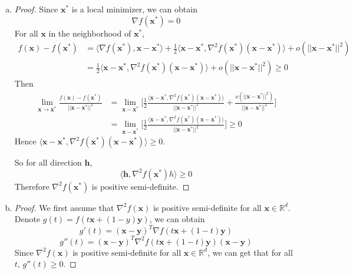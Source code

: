 \documentclass[12pt]{article}
\newcommand{\R}{\mathbb{R}}
\renewcommand{\vec}[1]{\mathbf{#1}}
\begin{document}
\begin{enumerate}[1)]
\begin{enumerate}[(a)]
\begin{proof}
            Therefore, if $f$ is strictly convex, then $f$ has at most one global minimizer.
        \end{proof}
        \item
        \begin{proof}
        	Since $\vec{x}^{*}$ is a local minimizer,  we can obtain
            $$\nabla f(\vec{x}^{*}) = 0$$
            For all $\vec{x}$ in the neighborhood of $\vec{x}^{*}$,
            \begin{align*}
            	f(\vec{x}) - f(\vec{x}^{*}) & = \langle \nabla f(\vec{x}^{*}), \vec{x} - \vec{x}^{*} \rangle + \frac{1}{2} \langle \vec{x} - \vec{x}^{*}, \nabla^{2}f(\vec{x}^{*})(\vec{x} -\vec{x}^{*})\rangle + o(||\vec{x} - \vec{x}^{*}||^{2}) \\
                & = \frac{1}{2} \langle \vec{x} - \vec{x}^{*}, \nabla^{2}f(\vec{x}^{*})(\vec{x} -\vec{x}^{*})\rangle + o(||\vec{x} - \vec{x}^{*}||^{2}) \geq 0
            \end{align*}
           Then
           \begin{align*}
           	\lim_{\vec{x} \rightarrow \vec{x}^{*}} \frac{f(\vec{x}) - f(\vec{x}^{*})}{||\vec{x} - \vec{x}^{*}||^{2}}  & = \lim_{\vec{x} - \vec{x}^{*}}\bigg[\frac{1}{2} \frac{\langle \vec{x} - \vec{x}^{*}, \nabla^{2}f(\vec{x}^{*})(\vec{x} -\vec{x}^{*})\rangle}{||\vec{x} - \vec{x}^{*}||^{2}} + \frac{o(||\vec{x} - \vec{x}^{*}||^{2})}{||\vec{x} - \vec{x}^{*}||^{2}}\bigg] \\
            & = \lim_{\vec{x} - \vec{x}^{*}}\bigg[\frac{1}{2} \frac{\langle \vec{x} - \vec{x}^{*}, \nabla^{2}f(\vec{x}^{*})(\vec{x} -\vec{x}^{*})\rangle}{||\vec{x} - \vec{x}^{*}||^{2}}\bigg] \geq 0
           \end{align*}
           Hence $\langle \vec{x} - \vec{x}^{*}, \nabla^{2}f(\vec{x}^{*})(\vec{x} -\vec{x}^{*})\rangle \geq 0$. 
           
           So for all direction $\vec{h}$, $$\langle \vec{h}, \nabla^{2}f(\vec{x}^{*}){h} \rangle \geq 0$$ 
           Therefore $\nabla^{2}f(\vec{x}^{*})$ is positive semi-definite.
        \end{proof}
        \item
        \begin{proof}
        	We first assume that $\nabla^{2} f(\vec{x})$ is positive semi-definite for all $\vec{x} \in \R^{d}$.
            Denote $g(t) = f(t\vec{x}  + (1-y)\vec{y})$, we can obtain
            $$g'(t) = (\vec{x} - \vec{y})^{T}\nabla f(t\vec{x} + (1-t)\vec{y})$$
            $$g''(t) = (\vec{x} - \vec{y})^{T}\nabla^{2}f(t\vec{x} + (1-t)\vec{y})(\vec{x} - \vec{y})$$
            Since $\nabla^{2} f(\vec{x})$ is positive semi-definite for all $\vec{x} \in \R^{d}$, we can get that for all $t$, $g''(t) \geq 0$.
            

\end{proof}
\end{enumerate}
\end{enumerate}
\end{document}
